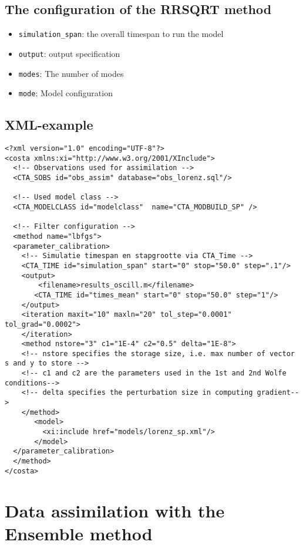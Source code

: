 
\subsection{The configuration of the RRSQRT method}
\begin{itemize}
\item {\tt simulation\_span}: the overall timespan to run the model
\item {\tt output}: output specification
\item {\tt modes}: The number of modes
\item {\tt mode}: Model configuration
\end{itemize}

\subsection{XML-example}

\begin{verbatim}
<?xml version="1.0" encoding="UTF-8"?>
<costa xmlns:xi="http://www.w3.org/2001/XInclude">
  <!-- Observations used for assimilation -->
  <CTA_SOBS id="obs_assim" database="obs_lorenz.sql"/>

  <!-- Used model class -->
  <CTA_MODELCLASS id="modelclass"  name="CTA_MODBUILD_SP" />

  <!-- Filter configuration -->
  <method name="lbfgs">
  <parameter_calibration>
    <!-- Simulatie timespan en stapgrootte via CTA_Time -->
    <CTA_TIME id="simulation_span" start="0" stop="50.0" step=".1"/>
    <output>
        <filename>results_oscill.m</filename> 
       <CTA_TIME id="times_mean" start="0" stop="50.0" step="1"/>
    </output>
    <iteration maxit="10" maxln="20" tol_step="0.0001" tol_grad="0.0002">
    </iteration>
    <method nstore="3" c1="1E-4" c2="0.5" delta="1E-8">
    <!-- nstore specifies the storage size, i.e. max number of vector s and y to store -->
    <!-- c1 and c2 are the parameters used in the 1st and 2nd Wolfe conditions-->
    <!-- delta specifies the perturbation size in computing gradient-->
    </method>
       <model>
         <xi:include href="models/lorenz_sp.xml"/>
       </model>
  </parameter_calibration>
  </method>
</costa>
\end{verbatim}


\section{Data assimilation  with the Ensemble method}

